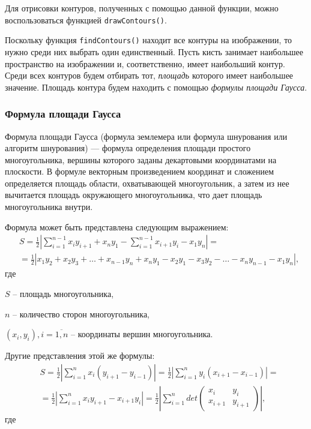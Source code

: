 Для отрисовки контуров, полученных с помощью данной функции, можно воспользоваться
функцией {\tt drawContours()}.

Поскольку функция {\tt findContours()} находит все контуры на 
изображении, то нужно среди них выбрать один единственный. 
Пусть кисть занимает наибольшее пространство на изображении и, 
соответственно, имеет наибольший контур. Среди всех контуров будем 
отбирать тот, {\it площадь} которого имеет наибольшее значение. 
Площадь контура будем находить с помощью {\it формулы площади Гаусса}.


\subsubsection{Формула площади Гаусса}

Формула площади Гаусса (формула землемера или формула шнурования или
алгоритм шнурования) — формула определения площади простого
многоугольника, вершины которого заданы декартовыми координатами на
плоскости. В формуле векторным произведением координат и сложением
определяется площадь области, охватывающей многоугольник, а затем из
нее вычитается площадь окружающего многоугольника, что дает площадь
многоугольника внутри. 

Формула может быть представлена следующим выражением:
\begin{equation}
\begin{aligned}
	&S = \frac{1}{2} \left| 
	\sum_{i=1}^{n-1}{x_i y_{i+1}}+x_n y_1 -
	\sum_{i=1}^{n-1}{x_{i+1} y_i} - x_1 y_n
	\right|=\\
	&=\frac{1}{2} \left| x_1 y_2 + x_2 y_3 + 
	\dots + x_{n-1} y_n + x_n y_1 - x_2 y_1
	-x_3 y_2 - \dots - x_n y_{n-1} - x_1 y_n\right|,
\end{aligned}
\label{gauss-square-equation}
\end{equation}
где

$S$ -- площадь многоугольника,

$n$ -- количество сторон многоугольника,

$(x_i, y_i), i=\overline{1,n}$ -- координаты вершин многоугольника.

Другие представления этой же формулы:
\begin{equation}
\begin{aligned}
	&S = \frac{1}{2} \left| 
	\sum_{i=1}^n{x_i (y_{i+1}-y_{i-1})} \right| =
	\frac{1}{2} \left| 
	\sum_{i=1}^n{y_i (x_{i+1}-x_{i-1})} \right| =\\
	&= \frac{1}{2} \left| 
	\sum_{i=1}^n{x_i y_{i+1} - x_{i+1} y_i} \right| =
	\frac{1}{2} \left| 
	\sum_{i=1}^n{det
	\begin{pmatrix}
		x_i & y_i \\
		x_{i+1} & y_{i+1}
	\end{pmatrix}
	} \right|,
\end{aligned}
\label{gauss-square-equation-1}
\end{equation}
где

